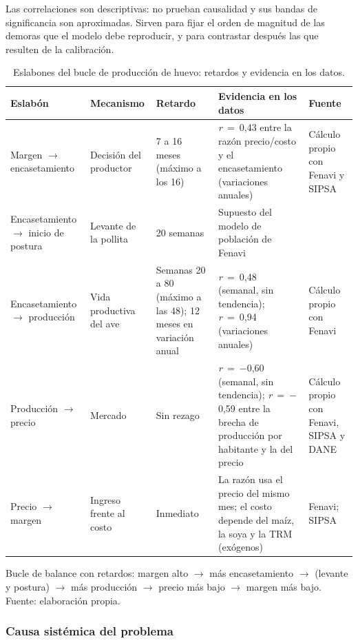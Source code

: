 \documentclass[preprint,12pt,authoryear]{elsarticle}
\begin{document}
Las correlaciones son descriptivas: no prueban causalidad y sus bandas de significancia son aproximadas. Sirven para fijar el orden de magnitud de las demoras que el modelo debe reproducir, y para contrastar después las que resulten de la calibración.

\begin{table}[!htbp]
\centering
\caption{Eslabones del bucle de producción de huevo: retardos y evidencia en los datos.}
\label{tab:eslabones}
\footnotesize
\setlength{\tabcolsep}{4pt}
\begin{tabularx}{\textwidth}{@{}P{2.3cm}P{1.8cm}P{2.1cm}LP{2.0cm}@{}}
\toprule
Eslabón & Mecanismo & Retardo & Evidencia en los datos & Fuente \\
\midrule
Margen $\rightarrow$ encasetamiento & Decisión del productor & 7 a 16 meses (máximo a los 16) & \textit{r}~=~0,43 entre la razón precio/costo y el encasetamiento (variaciones anuales) & Cálculo propio con Fenavi y SIPSA \\
\addlinespace
Encasetamiento $\rightarrow$ inicio de postura & Levante de la pollita & 20 semanas & Supuesto del modelo de población de Fenavi & \citet{Fenavi2026Fenaviquin440} \\
\addlinespace
Encasetamiento $\rightarrow$ producción & Vida productiva del ave & Semanas 20 a 80 (máximo a las 48); 12 meses en variación anual & \textit{r}~=~0,48 (semanal, sin tendencia); \textit{r}~=~0,94 (variaciones anuales) & Cálculo propio con Fenavi \\
\addlinespace
Producción $\rightarrow$ precio & Mercado & Sin rezago & \textit{r}~=~$-$0,60 (semanal, sin tendencia); \textit{r}~=~$-$0,59 entre la brecha de producción por habitante y la del precio & Cálculo propio con Fenavi, SIPSA y DANE \\
\addlinespace
Precio $\rightarrow$ margen & Ingreso frente al costo & Inmediato & La razón usa el precio del mismo mes; el costo depende del maíz, la soya y la TRM (exógenos) & Fenavi; SIPSA \\
\bottomrule
\end{tabularx}

\smallskip
{\footnotesize\raggedright Bucle de balance con retardos: margen alto $\rightarrow$ más encasetamiento $\rightarrow$ (levante y postura) $\rightarrow$ más producción $\rightarrow$ precio más bajo $\rightarrow$ margen más bajo. Fuente: elaboración propia.\par}
\end{table}

\subsubsection{Causa sistémica del problema}
\end{document}
